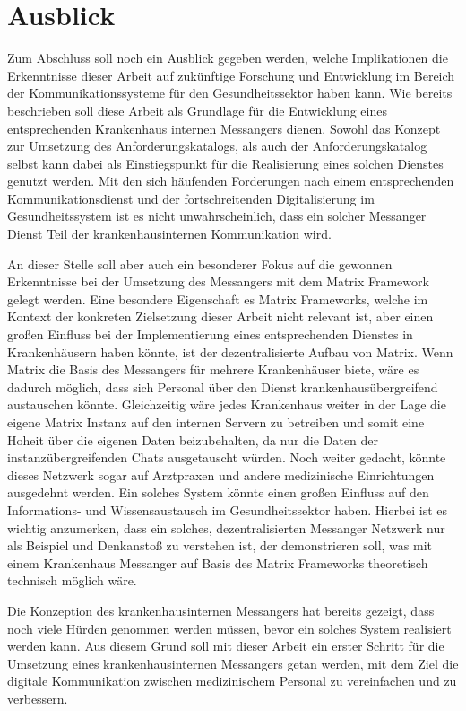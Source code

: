 \section{Ausblick}\label{chapter:fazit}
Zum Abschluss soll noch ein Ausblick gegeben werden, welche Implikationen die Erkenntnisse dieser Arbeit auf zukünftige Forschung und Entwicklung im Bereich der Kommunikationssysteme für den Gesundheitssektor haben kann. Wie bereits beschrieben soll diese Arbeit als Grundlage für die Entwicklung eines entsprechenden Krankenhaus internen Messangers dienen. Sowohl das Konzept zur Umsetzung des Anforderungskatalogs, als auch der Anforderungskatalog selbst kann dabei als Einstiegspunkt für die Realisierung eines solchen Dienstes genutzt werden. Mit den sich häufenden Forderungen nach einem entsprechenden Kommunikationsdienst und der fortschreitenden Digitalisierung im Gesundheitssystem ist es nicht unwahrscheinlich, dass ein solcher Messanger Dienst Teil der krankenhausinternen Kommunikation wird. 

An dieser Stelle soll aber auch ein besonderer Fokus auf die gewonnen Erkenntnisse bei der Umsetzung des Messangers mit dem Matrix Framework gelegt werden. Eine besondere Eigenschaft es Matrix Frameworks, welche im Kontext der konkreten Zielsetzung dieser Arbeit nicht relevant ist, aber einen großen Einfluss bei der Implementierung eines entsprechenden Dienstes in Krankenhäusern haben könnte, ist der dezentralisierte Aufbau von Matrix. Wenn Matrix die Basis des Messangers für mehrere Krankenhäuser biete, wäre es dadurch möglich, dass sich Personal über den Dienst krankenhausübergreifend austauschen könnte. Gleichzeitig wäre jedes Krankenhaus weiter in der Lage die eigene Matrix Instanz auf den internen Servern zu betreiben und somit eine Hoheit über die eigenen Daten beizubehalten, da nur die Daten der instanzübergreifenden Chats ausgetauscht würden. Noch weiter gedacht, könnte dieses Netzwerk sogar auf Arztpraxen und andere medizinische Einrichtungen ausgedehnt werden. Ein solches System könnte einen großen Einfluss auf den Informations- und Wissensaustausch im Gesundheitssektor haben. Hierbei ist es wichtig anzumerken, dass ein solches, dezentralisierten Messanger Netzwerk nur als Beispiel und Denkanstoß zu verstehen ist, der demonstrieren soll, was mit einem Krankenhaus Messanger auf Basis des Matrix Frameworks theoretisch technisch möglich wäre. 

Die Konzeption des krankenhausinternen Messangers hat bereits gezeigt, dass noch viele Hürden genommen werden müssen, bevor ein solches System realisiert werden kann. Aus diesem Grund soll mit dieser Arbeit ein erster Schritt für die Umsetzung eines krankenhausinternen Messangers getan werden, mit dem Ziel die digitale Kommunikation zwischen medizinischem Personal zu vereinfachen und zu verbessern. 

